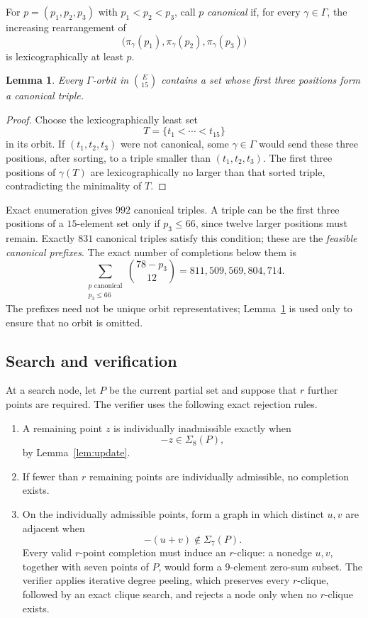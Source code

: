 \documentclass[11pt]{amsart}
\newtheorem{lemma}[theorem]{Lemma}
\begin{document}
For $p=(p_1,p_2,p_3)$ with $p_1<p_2<p_3$, call $p$ \emph{canonical}
if, for every $\gamma\in\Gamma$, the increasing rearrangement of
\[
  \bigl(
    \pi_\gamma(p_1),
    \pi_\gamma(p_2),
    \pi_\gamma(p_3)
  \bigr)
\]
is lexicographically at least $p$.

\begin{lemma}\label{lem:canonical}
Every $\Gamma$-orbit in $\binom{E}{15}$ contains a set whose first three
positions form a canonical triple.
\end{lemma}

\begin{proof}
Choose the lexicographically least set
\[
  T=\{t_1<\cdots<t_{15}\}
\]
in its orbit. If $(t_1,t_2,t_3)$ were not canonical, some
$\gamma\in\Gamma$ would send these three positions, after sorting, to a
triple smaller than $(t_1,t_2,t_3)$. The first three positions of
$\gamma(T)$ are lexicographically no larger than that sorted triple,
contradicting the minimality of $T$.
\end{proof}

Exact enumeration gives $992$ canonical triples. A triple can be the first
three positions of a $15$-element set only if $p_3\leq66$, since twelve
larger positions must remain. Exactly $831$ canonical triples satisfy this
condition; these are the \emph{feasible canonical prefixes}. The exact
number of completions below them is
\begin{equation}\label{eq:expected}
  \sum_{\substack{p\text{ canonical}\\p_3\leq66}}
  \binom{78-p_3}{12}
  =
  811{,}509{,}569{,}804{,}714.
\end{equation}
The prefixes need not be unique orbit representatives;
Lemma~\ref{lem:canonical} is used only to ensure that no orbit is omitted.

\subsection{Search and verification}

At a search node, let $P$ be the current partial set and suppose that
$r$ further points are required. The verifier uses the following exact
rejection rules.

\begin{enumerate}
\item
A remaining point $z$ is individually inadmissible exactly when
\[
  -z\in\Sigma_8(P),
\]
by Lemma~\ref{lem:update}.

\item
If fewer than $r$ remaining points are individually admissible, no
completion exists.

\item
On the individually admissible points, form a graph in which distinct
$u,v$ are adjacent when
\[
  -(u+v)\notin\Sigma_7(P).
\]
Every valid $r$-point completion must induce an $r$-clique: a nonedge
$u,v$, together with seven points of $P$, would form a $9$-element
zero-sum subset. The verifier applies iterative degree peeling, which
preserves every $r$-clique, followed by an exact clique search, and
rejects a node only when no $r$-clique exists.
\end{enumerate}
\end{document}
